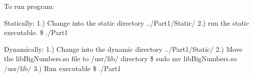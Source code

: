 To run program\+:

Statically\+: 1.) Change into the static directory ../\+Part1/\+Static/ 2.) run the static executable. \$ ./\+Part1

Dynamically\+: 1.) Change into the dynamic directory ../\+Part1/\+Static/ 2.) Move the lib\+Big\+Numbers.\+so file to /usr/lib/ directory \$ sudo mv lib\+Big\+Numbers.\+so /usr/lib/ 3.) Run executable \$ ./\+Part1 